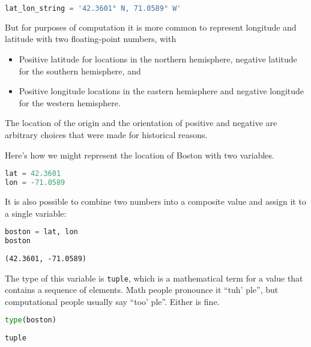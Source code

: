 \begin{lstlisting}[language=Python,style=source]
lat_lon_string = '42.3601° N, 71.0589° W'
\end{lstlisting}

But for purposes of computation it is more common to represent longitude
and latitude with two floating-point numbers, with

\begin{itemize}
\item
  Positive latitude for locations in the northern hemisphere, negative
  latitude for the southern hemisphere, and
\item
  Positive longitude locations in the eastern hemisphere and negative
  longitude for the western hemisphere.
\end{itemize}

The location of the origin and the orientation of positive and negative
are arbitrary choices that were made for historical reasons.

\pagebreak

Here's how
we might represent the location of Boston with two variables.

\begin{lstlisting}[language=Python,style=source]
lat = 42.3601
lon = -71.0589
\end{lstlisting}

It is also possible to combine two numbers into a composite value and
assign it to a single variable:

\begin{lstlisting}[language=Python,style=source]
boston = lat, lon
boston
\end{lstlisting}

\begin{lstlisting}[style=output]
(42.3601, -71.0589)
\end{lstlisting}

The type of this variable is \passthrough{\lstinline!tuple!}, which is a
mathematical term for a value that contains a sequence of elements. Math
people pronounce it ``tuh' ple'', but computational people usually say
``too' ple''. Either is fine.

\begin{lstlisting}[language=Python,style=source]
type(boston)
\end{lstlisting}

\begin{lstlisting}[style=output]
tuple
\end{lstlisting}


